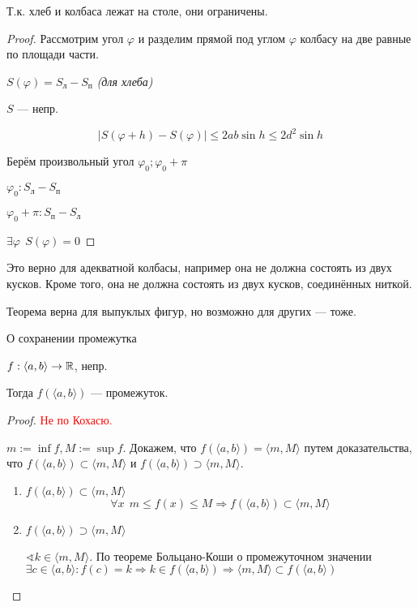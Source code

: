     \begin{remark}
        Т.к. хлеб и колбаса лежат на столе, они ограничены.
    \end{remark}
    \begin{proof}
        Рассмотрим угол $\varphi$ и разделим прямой под углом $\varphi$ колбасу на две равные по площади части.

        $S(\varphi) = S_{\text{л}}-S_{\text{п}}$ \textit{(для хлеба)}

        $S$ --- непр.

        $$|S(\varphi+h)-S(\varphi)|\leq 2ab\sin h\leq 2d^2\sin h$$

        Берём произвольный угол $\varphi_0; \varphi_0+\pi$

        $\varphi_0: S_{\text{л}} - S_{\text{п}}$

        $\varphi_0+\pi: S_{\text{п}} - S_{\text{л}}$

        $\exists \varphi \ \ S(\varphi)=0$
    \end{proof}
    \begin{remark}
        Это верно для адекватной колбасы, например она не должна состоять из двух кусков. Кроме того, она не должна состоять из двух кусков, соединённых ниткой.

        Теорема верна для выпуклых фигур, но возможно для других --- тоже.
    \end{remark}
    \begin{theorem}
        О сохранении промежутка
        
        $f:\langle a,b \rangle \to\mathbb{R}$, непр.

        Тогда $f(\langle a,b \rangle)$ --- промежуток.
    \end{theorem}
    \begin{proof}
        \textcolor{red}{Не по Кохасю.}

        $m:=\inf f, M:=\sup f$. Докажем, что $f(\langle a,b \rangle)=\langle m,M \rangle$ путем доказательства, что $f(\langle a,b \rangle)\subset\langle m,M \rangle$ и $f(\langle a,b \rangle)\supset\langle m,M \rangle$.
        \begin{enumerate}
            \item $f(\langle a,b \rangle)\subset\langle m,M \rangle$
            $$\forall x \ \ m\leq f(x)\leq M \Rightarrow f(\langle a,b \rangle)\subset\langle m,M \rangle$$

            \item $f(\langle a,b \rangle)\supset\langle m,M \rangle$
            
            $\sphericalangle k\in\langle m,M \rangle$. По теореме Больцано-Коши о промежуточном значении $\exists c\in\langle a,b \rangle: f(c)=k\Rightarrow k\in f(\langle a,b\rangle)\Rightarrow \langle m,M \rangle\subset f(\langle a,b \rangle)$
        \end{enumerate}
    \end{proof}
